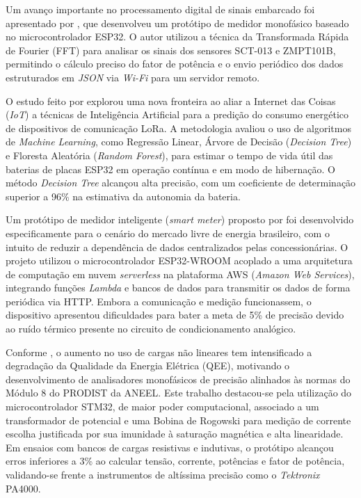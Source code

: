 Um avanço importante no processamento digital de sinais embarcado foi apresentado por , que desenvolveu um protótipo de medidor monofásico baseado no microcontrolador ESP32. O autor utilizou a técnica da Transformada Rápida de Fourier (FFT) para analisar os sinais dos sensores SCT-013 e ZMPT101B, permitindo o cálculo preciso do fator de potência e o envio periódico dos dados estruturados em \textit{JSON} via \textit{Wi-Fi} para um servidor remoto.

O estudo feito por  explorou uma nova fronteira ao aliar a Internet das Coisas (\textit{IoT}) a técnicas de Inteligência Artificial para a predição do consumo energético de dispositivos de comunicação LoRa. A metodologia avaliou o uso de algoritmos de \textit{Machine Learning}, como Regressão Linear, Árvore de Decisão (\textit{Decision Tree}) e Floresta Aleatória (\textit{Random Forest}), para estimar o tempo de vida útil das baterias de placas ESP32 em operação contínua e em modo de hibernação. O método \textit{Decision Tree} alcançou alta precisão, com um coeficiente de determinação superior a 96\% na estimativa da autonomia da bateria.

Um protótipo de medidor inteligente (\textit{smart meter}) proposto por  foi desenvolvido especificamente para o cenário do mercado livre de energia brasileiro, com o intuito de reduzir a dependência de dados centralizados pelas concessionárias. O projeto utilizou o microcontrolador ESP32-WROOM acoplado a uma arquitetura de computação em nuvem \textit{serverless} na plataforma AWS (\textit{Amazon Web Services}), integrando funções \textit{Lambda} e bancos de dados para transmitir os dados de forma periódica via HTTP. Embora a comunicação e medição funcionassem, o dispositivo apresentou dificuldades para bater a meta de 5\% de precisão devido ao ruído térmico presente no circuito de condicionamento analógico.

Conforme , o aumento no uso de cargas não lineares tem intensificado a degradação da Qualidade da Energia Elétrica (QEE), motivando o desenvolvimento de analisadores monofásicos de precisão alinhados às normas do Módulo 8 do PRODIST da ANEEL. Este trabalho destacou-se pela utilização do microcontrolador STM32, de maior poder computacional, associado a um transformador de potencial e uma Bobina de Rogowski para medição de corrente escolha justificada por sua imunidade à saturação magnética e alta linearidade. Em ensaios com bancos de cargas resistivas e indutivas, o protótipo alcançou erros inferiores a 3\% ao calcular tensão, corrente, potências e fator de potência, validando-se frente a instrumentos de altíssima precisão como o \textit{Tektronix} PA4000.

